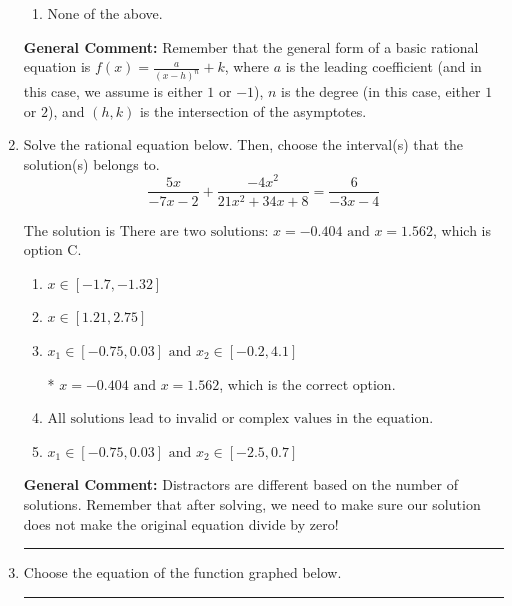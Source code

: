 \documentclass{extbook}[14pt]
\newcommand{\litem}[1]{\item #1

\rule{\textwidth}{0.4pt}}
\begin{document}
\begin{enumerate}
{\begin{enumerate}[label=\Alph*.]
\item None of the above.\end{enumerate}
\textbf{General Comment:} Remember that the general form of a basic rational equation is $ f(x) = \frac{a}{(x-h)^n} + k$, where $a$ is the leading coefficient (and in this case, we assume is either $1$ or $-1$), $n$ is the degree (in this case, either $1$ or $2$), and $(h, k)$ is the intersection of the asymptotes.
}
\litem{
Solve the rational equation below. Then, choose the interval(s) that the solution(s) belongs to.
\[ \frac{5x}{-7x -2} + \frac{-4x^{2}}{21x^{2} +34 x + 8} = \frac{6}{-3x -4} \]

The solution is \( \text{There are two solutions: } x = -0.404 \text{ and } x = 1.562 \), which is option C.\begin{enumerate}[label=\Alph*.]
\item \( x \in [-1.7,-1.32] \)


\item \( x \in [1.21,2.75] \)


\item \( x_1 \in [-0.75, 0.03] \text{ and } x_2 \in [-0.2,4.1] \)

* $x = -0.404 \text{ and } x = 1.562$, which is the correct option.
\item \( \text{All solutions lead to invalid or complex values in the equation.} \)


\item \( x_1 \in [-0.75, 0.03] \text{ and } x_2 \in [-2.5,0.7] \)


\end{enumerate}

\textbf{General Comment:} Distractors are different based on the number of solutions. Remember that after solving, we need to make sure our solution does not make the original equation divide by zero!
}
\litem{
Choose the equation of the function graphed below.

}
\end{enumerate}
\end{document}
